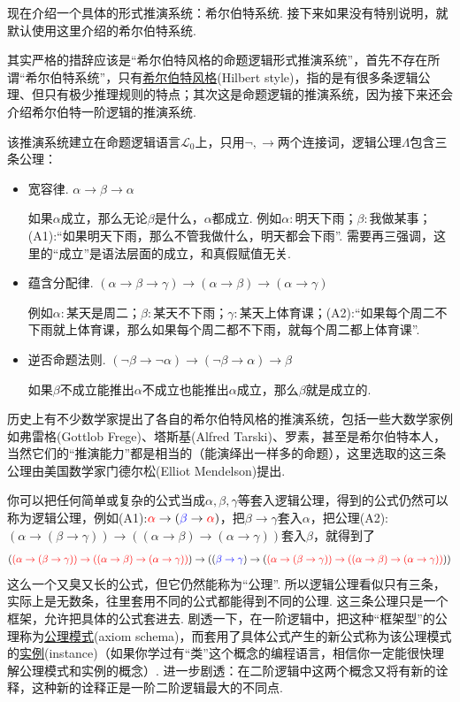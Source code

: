 现在介绍一个具体的形式推演系统：希尔伯特系统. 接下来如果没有特别说明，就默认使用这里介绍的希尔伯特系统. 

其实严格的措辞应该是“希尔伯特风格的命题逻辑形式推演系统”，首先不存在所谓“希尔伯特系统”，只有\underline{希尔伯特风格}(Hilbert style)，指的是有很多条逻辑公理、但只有极少推理规则的特点；其次这是命题逻辑的推演系统，因为接下来还会介绍希尔伯特一阶逻辑的推演系统. 

该推演系统建立在命题逻辑语言\(\mathcal{L}_0\)上，只用\(\neg, \to\)两个连接词，逻辑公理\(\Lambda\)包含三条公理：
\begin{itemize}
    \item [(A1)] 宽容律. \(\alpha \to \beta \to \alpha\)
    \begin{note}
        如果\(\alpha\)成立，那么无论\(\beta\)是什么，\(\alpha\)都成立. 例如\(\alpha:\)明天下雨；\(\beta:\)我做某事；(A1):“如果明天下雨，那么不管我做什么，明天都会下雨”. 需要再三强调，这里的“成立”是语法层面的成立，和真假赋值无关.
    \end{note}
    \item [(A2)] 蕴含分配律. \((\alpha \to \beta \to \gamma) \to (\alpha \to \beta) \to (\alpha \to \gamma)\)
    \begin{note}
        例如\(\alpha:\)某天是周二；\(\beta:\)某天不下雨；\(\gamma:\)某天上体育课；(A2):“如果每个周二不下雨就上体育课，那么如果每个周二都不下雨，就每个周二都上体育课”.
    \end{note}
    \item [(A3)] 逆否命题法则. \((\neg \beta \to \neg \alpha) \to (\neg \beta \to \alpha) \to \beta\)
    \begin{note}
        如果\(\beta\)不成立能推出\(\alpha\)不成立也能推出\(\alpha\)成立，那么\(\beta\)就是成立的.
    \end{note}
\end{itemize}

历史上有不少数学家提出了各自的希尔伯特风格的推演系统，包括一些大数学家例如弗雷格(Gottlob Frege)、塔斯基(Alfred Tarski)、罗素，甚至是希尔伯特本人，当然它们的“推演能力”都是相当的（能演绎出一样多的命题），这里选取的这三条公理由美国数学家门德尔松(Elliot Mendelson)提出.

你可以把任何简单或复杂的公式当成\(\alpha,\beta,\gamma\)等套入逻辑公理，得到的公式仍然可以称为逻辑公理，例如(A1):\({\color{red}\alpha} \to ({\color{blue}\beta} \to {\color{red}\alpha})\)，把\(\beta \to \gamma\)套入\(\alpha\)，把公理(A2):\((\alpha \to (\beta \to \gamma)) \to ((\alpha \to \beta) \to (\alpha \to \gamma))\)套入\(\beta\)，就得到了
\[({\color{red} (\alpha \to (\beta \to \gamma)) \to ((\alpha \to \beta) \to (\alpha \to \gamma))}) \to (({\color{blue}\beta \to \gamma}) \to ({\color{red}(\alpha \to (\beta \to \gamma)) \to ((\alpha \to \beta) \to (\alpha \to \gamma))}))\]
这么一个又臭又长的公式，但它仍然能称为“公理”. 所以逻辑公理看似只有三条，实际上是无数条，往里套用不同的公式都能得到不同的公理. 这三条公理只是一个框架，允许把具体的公式套进去. 剧透一下，在一阶逻辑中，把这种“框架型”的公理称为\underline{公理模式}(axiom schema)，而套用了具体公式产生的新公式称为该公理模式的\underline{实例}(instance)（如果你学过有“类”这个概念的编程语言，相信你一定能很快理解公理模式和实例的概念）. 进一步剧透：在二阶逻辑中这两个概念又将有新的诠释，这种新的诠释正是一阶二阶逻辑最大的不同点. 

